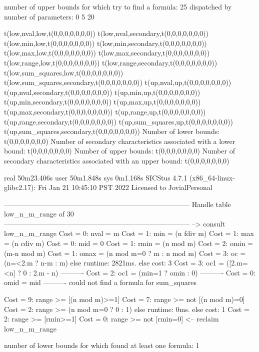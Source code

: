 number of upper bounds for which try to find a formula: 25
dispatched by number of parameters: 0  5  20

t(low,nval,low,t(0,0,0,0,0,0,0))
t(low,nval,secondary,t(0,0,0,0,0,0,0))
t(low,min,low,t(0,0,0,0,0,0,0))
t(low,min,secondary,t(0,0,0,0,0,0,0))
t(low,max,low,t(0,0,0,0,0,0,0))
t(low,max,secondary,t(0,0,0,0,0,0,0))
t(low,range,low,t(0,0,0,0,0,0,0))
t(low,range,secondary,t(0,0,0,0,0,0,0))
t(low,sum_squares,low,t(0,0,0,0,0,0,0))
t(low,sum_squares,secondary,t(0,0,0,0,0,0,0))
t(up,nval,up,t(0,0,0,0,0,0,0))
t(up,nval,secondary,t(0,0,0,0,0,0,0))
t(up,min,up,t(0,0,0,0,0,0,0))
t(up,min,secondary,t(0,0,0,0,0,0,0))
t(up,max,up,t(0,0,0,0,0,0,0))
t(up,max,secondary,t(0,0,0,0,0,0,0))
t(up,range,up,t(0,0,0,0,0,0,0))
t(up,range,secondary,t(0,0,0,0,0,0,0))
t(up,sum_squares,up,t(0,0,0,0,0,0,0))
t(up,sum_squares,secondary,t(0,0,0,0,0,0,0))
Number of lower bounds:                                             t(0,0,0,0,0,0,0)
Number of secondary characteristics associated with a lower bound:  t(0,0,0,0,0,0,0)
Number of upper bounds:                                             t(0,0,0,0,0,0,0)
Number of secondary characteristics associated with an upper bound: t(0,0,0,0,0,0,0)

real	50m23.406s
user	50m1.848s
sys	0m1.168s
SICStus 4.7.1 (x86_64-linux-glibc2.17): Fri Jan 21 10:45:10 PST 2022
Licensed to JovialPersonal


--------------------------------------------------------------------------------
Handle table low_n_m_range of 30
--------------------------------------------------------------------------------
--> consult low_n_m_range
Cost =  0:  nval        = m
Cost =  1:  min         = (n fdiv m)
Cost =  1:  max         = (n cdiv m)
Cost =  0:  mid         = 0
Cost =  1:  rmin        = (n mod m)
Cost =  2:  omin        = (m-n mod m)
Cost =  1:  omax        = (n mod m=0 ? m : n mod m)
Cost =  3:  oc          = (n=<2.m ? n-m : m)
else runtime: 2821ms. else cost: 3
Cost =  3:  oc1         = ([2.m=<n] ? 0 : 2.m - n) %
----------
Cost =  2:  oc1         = (min=1 ? omin : 0)
----------
Cost =  0:  omid        = mid
----------
could not find a formula for sum_squares

Cost =  9:  range >= [(n mod m)>=1]
Cost =  7:  range >= not [(n mod m)=0]
Cost =  2:  range >= (n mod m=0 ? 0 : 1)
else runtime: 0ms. else cost: 1
Cost =  2:  range >= [rmin>=1]
Cost =  0:  range >= not [rmin=0]
<-- reclaim low_n_m_range

number of lower bounds for which found at least one formula: 1

